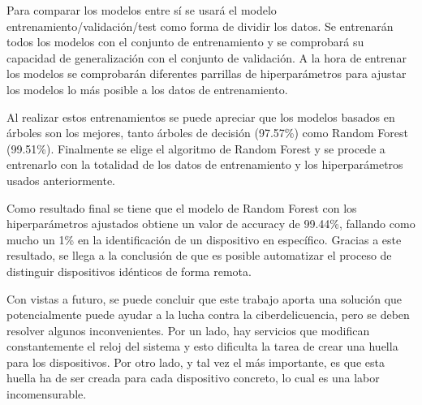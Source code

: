 Para comparar los modelos entre sí se usará el modelo entrenamiento/validación/test como forma de dividir los datos. Se entrenarán todos los modelos con el conjunto de entrenamiento y se comprobará su capacidad de generalización con el conjunto de validación. A la hora de entrenar los modelos se comprobarán diferentes parrillas de hiperparámetros para ajustar los modelos lo más posible a los datos de entrenamiento.

Al realizar estos entrenamientos se puede apreciar que los modelos basados en árboles son los mejores, tanto árboles de decisión (97.57\%) como Random Forest (99.51\%). Finalmente se elige el algoritmo de Random Forest y se procede a entrenarlo con la totalidad de los datos de entrenamiento y los hiperparámetros usados anteriormente. 

Como resultado final se tiene que el modelo de Random Forest con los hiperparámetros ajustados obtiene un valor de accuracy de 99.44\%, fallando como mucho un 1\% en la identificación de un dispositivo en específico. Gracias a este resultado, se llega a la conclusión de que es posible automatizar el proceso de distinguir dispositivos idénticos de forma remota.

Con vistas a futuro, se puede concluir que este trabajo aporta una solución que potencialmente puede ayudar a la lucha contra la ciberdelicuencia, pero se deben resolver algunos inconvenientes. Por un lado, hay servicios que modifican constantemente el reloj del sistema y esto dificulta la tarea de crear una huella para los dispositivos. Por otro lado, y tal vez el más importante, es que esta huella ha de ser creada para cada dispositivo concreto, lo cual es una labor incomensurable.

